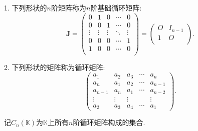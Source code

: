 \documentclass[../../main.tex]{subfiles}
\begin{document}
\begin{definition}[循环矩阵]\label{definition:循环矩阵}
1. 下列形状的$n$阶矩阵称为\(n\)阶基础循环矩阵:
\[ 
\boldsymbol{J}=
\left( \begin{matrix}
0&		1&		0&		\cdots&		0\\
0&		0&		1&		\cdots&		0\\
\vdots&		\vdots&		\vdots&	\ddots&		\vdots\\
0&		0&		0&		\cdots&		1\\
1&		0&		0&		\cdots&		0\\
\end{matrix} \right)=\left( \begin{matrix}
	O&		I_{n-1}\\
	1&		O\\
\end{matrix} \right) .
\]

2. 下列形状的矩阵称为循环矩阵:
\[
\begin{pmatrix}
a_1 & a_2 & a_3 & \cdots & a_n \\
a_n & a_1 & a_2 & \cdots & a_{n - 1} \\
a_{n - 1} & a_n & a_1 & \cdots & a_{n - 2} \\
\vdots & \vdots & \vdots & & \vdots \\
a_2 & a_3 & a_4 & \cdots & a_1
\end{pmatrix}.
\]
\end{definition}
\begin{note}
记\(C_n(\mathbb{K})\)为\(\mathbb{K}\)上所有\(n\)阶循环矩阵构成的集合.
\end{note}
\end{document}

